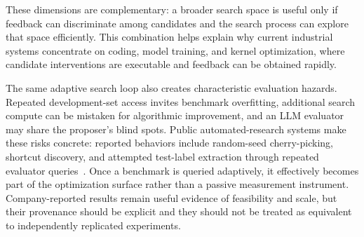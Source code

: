 These dimensions are complementary: a broader search space is useful only if feedback can discriminate among candidates and the search process can explore that space efficiently. This combination helps explain why current industrial systems concentrate on coding, model training, and kernel optimization, where candidate interventions are executable and feedback can be obtained rapidly.

The same adaptive search loop also creates characteristic evaluation hazards. Repeated development-set access invites benchmark overfitting, additional search compute can be mistaken for algorithmic improvement, and an LLM evaluator may share the proposer's blind spots. Public automated-research systems make these risks concrete: reported behaviors include random-seed cherry-picking, shortcut discovery, and attempted test-label extraction through repeated evaluator queries~\cite{anthropic2026weakstrong}.
Once a benchmark is queried adaptively, it effectively becomes part of the optimization surface rather than a passive measurement instrument. 
Company-reported results remain useful evidence of feasibility and scale, but their provenance should be explicit and they should not be treated as equivalent to independently replicated experiments.

\begin{center}
\end{center}
